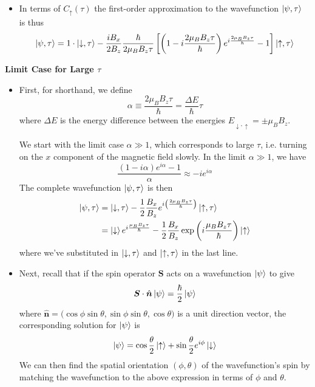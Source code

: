 \documentclass[11pt, a4paper]{article}
\renewcommand{\vec}[1]{\bm{#1}} %
\newcommand{\uvec}[1]{\hat{\vec{#1}}} %
\newcommand{\p}{\psi}  %
\newcommand{\ua}{\uparrow}  %
\newcommand{\da}{\downarrow}  %
\begin{document}
\begin{itemize}
	\item In terms of $ C_{\ua}(\tau) $ the first-order approximation to the wavefunction $ \ket{\p, \tau} $ is thus
	\begin{equation*}
		\ket{\p, \tau} = 1 \cdot \ket{\da, \tau} -\frac{iB_{x}}{2B_{z}} \frac{\hbar}{2\mu_{B}B_{z}\tau} \left[\left(1 - i \frac{2\mu_{B}B_{z}\tau}{\hbar}\right)e^{i\frac{2\mu_{B}B_{z}\tau}{\hbar}} - 1\right]\ket{\ua, \tau}
	\end{equation*}
\end{itemize}

\textbf{Limit Case for Large $ \tau $}
\begin{itemize}	
	\item First, for shorthand, we define
	\begin{equation*}
        \alpha \equiv \frac{2\mu_{B}B_{z}\tau}{\hbar} = \frac{\Delta E}{\hbar}\tau 
	\end{equation*}
    where $ \Delta E $ is the energy difference between the energies $ E_{\da, \ua} = \pm \mu_{B}B_{z} $.

	We start with the limit case $ \alpha \gg 1 $, which corresponds to large $ \tau $, i.e. turning on the $ x $ component of the magnetic field slowly. In the limit $ \alpha \gg 1 $, we have
	\begin{equation*}
		\frac{(1 - i\alpha)e^{i\alpha}-1}{\alpha} \approx - i e^{i\alpha}
	\end{equation*}
	The complete wavefunction $ \ket{\p, \tau} $ is then
	\begin{align*}
		\ket{\p, \tau} &= \ket{\da, \tau} -\frac{1}{2}\frac{B_{x}}{B_{z}} e^{i\left(\frac{2\mu_{B}B_{z}\tau}{\hbar}\right)}\ket{\ua, \tau}\\
		& = \ket{\da}e^{i\frac{\mu_{B}B_{z}\tau}{\hbar}} - \frac{1}{2}\frac{B_{x}}{B_{z}}\exp\left(i \frac{\mu_{B}B_{z}\tau}{\hbar}\right)\ket{\ua}
	\end{align*}
	where we've substituted in $ \ket{\da, \tau} $ and $ \ket{\ua, \tau} $ in the last line.
	
	\item Next, recall that if the spin operator $ \vec{S} $ acts on a wavefunction $ \ket{\p} $ to give
	\begin{equation*}
		\vec{S}\cdot \uvec{n} \ket{\p} = \frac{\hbar}{2} \ket{\p}
	\end{equation*}
	where $ \uvec{n} = \big(\cos \phi \sin \theta, \sin \phi \sin \theta, \cos \theta\big) $ is a unit direction vector, the corresponding solution for $ \ket{\p} $ is
	\begin{equation*}
		\ket{\p} = \cos \frac{\theta}{2}\ket{\ua} + \sin \frac{\theta}{2}e^{i\phi}\ket{\da}
	\end{equation*}
	We can then find the spatial orientation $ (\phi, \theta) $ of the wavefunction's spin by matching the wavefunction to the above expression in terms of $ \phi $ and $ \theta $.
	

\end{itemize}
\end{document}
